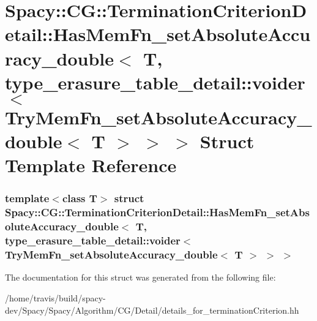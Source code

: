 \hypertarget{structSpacy_1_1CG_1_1TerminationCriterionDetail_1_1HasMemFn__setAbsoluteAccuracy__double_3_01T_01470eac3be2d8c219032b4d559256b6a}{\section{\-Spacy\-:\-:\-C\-G\-:\-:\-Termination\-Criterion\-Detail\-:\-:\-Has\-Mem\-Fn\-\_\-set\-Absolute\-Accuracy\-\_\-double$<$ \-T, type\-\_\-erasure\-\_\-table\-\_\-detail\-:\-:voider$<$ \-Try\-Mem\-Fn\-\_\-set\-Absolute\-Accuracy\-\_\-double$<$ \-T $>$ $>$ $>$ \-Struct \-Template \-Reference}
\label{structSpacy_1_1CG_1_1TerminationCriterionDetail_1_1HasMemFn__setAbsoluteAccuracy__double_3_01T_01470eac3be2d8c219032b4d559256b6a}
}
\subsubsection*{template$<$class T$>$ struct Spacy\-::\-C\-G\-::\-Termination\-Criterion\-Detail\-::\-Has\-Mem\-Fn\-\_\-set\-Absolute\-Accuracy\-\_\-double$<$ T, type\-\_\-erasure\-\_\-table\-\_\-detail\-::voider$<$ Try\-Mem\-Fn\-\_\-set\-Absolute\-Accuracy\-\_\-double$<$ T $>$ $>$ $>$}



\-The documentation for this struct was generated from the following file\-:\begin{DoxyCompactItemize}
\item 
/home/travis/build/spacy-\/dev/\-Spacy/\-Spacy/\-Algorithm/\-C\-G/\-Detail/details\-\_\-for\-\_\-termination\-Criterion.\-hh\end{DoxyCompactItemize}
